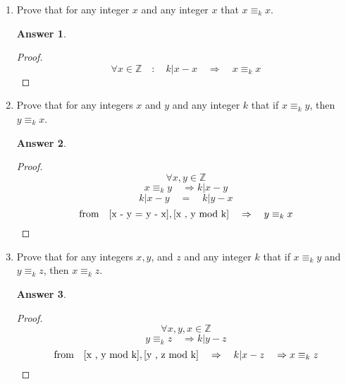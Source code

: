 \documentclass{article}
\renewcommand{\(}{\left(}
\renewcommand{\)}{\right)}
\theoremstyle{plain}
\theoremstyle{plain}
\theoremstyle{definition}
\newtheorem*{answer}{Answer}
\begin{document}
\begin{enumerate}[label*=\roman*.,ref=\roman*]
\item Prove that for any integer $x$ and any integer $x$ that $ x \equiv_k x $.
\begin{shaded}
\begin{answer}
\begin{proof}
 $$ \forall x \in \mathds{Z} \quad : \quad k | x - x \quad \Rightarrow \quad x \equiv_k x $$
\end{proof}
\end{answer}
\end{shaded}

\item Prove that for any integers $x$ and $y$ and any integer $k$ that if $x \equiv_k y$, then $y \equiv_k x$.
\begin{shaded}
\begin{answer}
\begin{proof}
$$ \forall x , y \in \mathds{Z} $$
\begin{equation}\label{x , y mod k}
x \equiv_k y \quad \Rightarrow k | x - y
\end{equation}
\begin{equation}\label{x - y = y - x}
  k | x - y \quad = \quad k | y - x
\end{equation}
$$ \text{from} \quad \ref{x - y = y - x}, \ref{x , y mod k} \quad \Rightarrow \quad y \equiv_k x $$
\end{proof}
\end{answer}
\end{shaded}

\item Prove that for any integers $x, y$, and $z$ and any integer $k$ that if $x \equiv_k y$ and $y \equiv_k z$, then $x \equiv_k z$.
\begin{shaded}
\begin{answer}
\begin{proof}
$$ \forall x , y , x \in \mathds{Z} $$
\begin{equation}\label{y , z mod k}
  y \equiv_k z \quad \Rightarrow k | y - z
\end{equation}
$$ \text{from} \quad \ref{x , y mod k} , \ref{y , z mod k} \quad \Rightarrow \quad k | x - z \quad \Rightarrow x \equiv_k z  $$
\end{proof}
\end{answer}
\end{shaded}


\end{enumerate}
\end{document}
